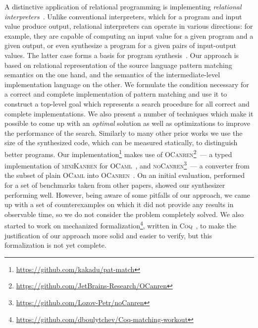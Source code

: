 A distinctive application of relational programming is implementing \emph{relational interpreters}~\cite{Untagged}. Unlike conventional interpreters, which for a program and
input value produce output, relational interpreters can operate in various directions: for example, they are capable of computing an input value for a given
program and a given output, or even synthesize a program for a given pairs of input-output values. The latter case forms a basis for program synthesis~\cite{unified,eigen}.
Our approach is based on relational representation of the source language pattern matching semantics on the one hand, and
the semantics of the intermediate-level implementation language on the other. We formulate the condition necessary for a correct and complete implementation of pattern matching and use it to
construct a top-level goal which represents a search procedure for all correct and complete implementations. We also present a number of techniques which make it possible to come up with an
\emph{optimal} solution as well as optimizations to improve the performance of the search. Similarly to many other prior works we use the size of the synthesized code, which can be measured
statically, to distinguish better programs. Our implementation\footnote{\url{https://github.com/kakadu/pat-match}} makes use of \textsc{OCanren}\footnote{\url{https://github.com/JetBrains-Research/OCanren}}~--- a typed implementation of \textsc{miniKanren} for \textsc{OCaml}~\cite{OCanren}, and \textsc{noCanren}\footnote{\url{https://github.com/Lozov-Petr/noCanren}}~--- a converter from the subset
of plain \textsc{OCaml} into \textsc{OCanren}~\cite{conversion}. On an initial  evaluation, performed for a set of benchmarks taken from other papers, showed our synthesizer performing well.
However, being aware of some pitfalls of our approach, we came up with a set of counterexamples on which it did not provide any results in observable time, so we do not consider the problem
completely solved. We also started to work on mechanized formalization\footnote{\url{https://github.com/dboulytchev/Coq-matching-workout}}, written in \textsc{Coq}~\cite{Coq}, to
make the justification of our approach more solid and easier to verify, but this formalization is not yet complete. 

 

\begin{comment}
We apply relational programming techniques to the problem of synthesizing efficient implementation for a pattern matching construct.
Although in principle pattern matching can be implemented in a trivial way, the result suffers from inefficiency in terms of both
performance and code size. Thus, in implementing functional languages alternative, more elaborate  approaches are widely used.
However, as there are multiple kinds and flavors of pattern matching constructs, these approaches have to be specifically developed
and justified for each concrete inhabitant of the pattern matching ``zoo''. We formulate the pattern matching synthesis problem in
declarative terms and apply relational programming, a specific form of constraint logic programming, to develop a 
develop optimizations which improve the efficiency of the synthesis and guarantee the
optimality of the result. 
\end{comment}
